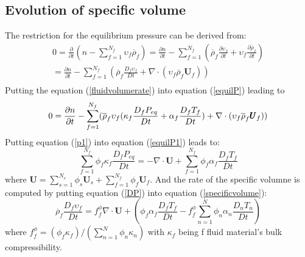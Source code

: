 \documentclass[preprint,12pt]{elsarticle}
\begin{document}
\subsection{\textsf{Evolution of specific volume}}
%
%
The restriction for the equilibrium pressure can be derived from:
%
%
\begin{equation}
\begin{gathered}
    0 = \frac{\partial }{\partial t} (n - \sum_{f=1}^{N_f} \upsilon_f \overline{\rho}_f) =  \frac{\partial n}{\partial t} - \sum_{f=1}^{N_f} (\overline{\rho}_f \frac{\partial \upsilon_f}{\partial t} + \upsilon_f \frac{\partial \overline{\rho}_f}{\partial t}) \\
= \frac{\partial n}{\partial t} - \sum_{f=1}^{N_f} (\overline{\rho}_f \frac{D_f \upsilon_f}{Dt} + \nabla \cdot (\upsilon_f \overline{\rho}_f \pmb{U}_f))\\
\label{equilP}
\end {gathered}
\end {equation}
%
%
Putting the equation (\ref{fluidvolumerate}) into equation (\ref{equilP}) leading to
%
%
\begin{equation} 
\label{equilP1}
    0= \frac{\partial n}{\partial t} - \sum_{f=1}^{N_f} (\overline{\rho}_f \upsilon_f (\kappa_f \frac{D_f P_{eq}}{Dt} + \alpha_f  \frac{D_f T_f}{Dt}) + \nabla \cdot (\upsilon_f \overline{\rho}_f \pmb{U}_f))\\
\end {equation}
%
%
Putting equation (\ref{p1}) into equation (\ref{equilP1}) leads to:
%
%
\begin{equation} 
    \sum_{f=1}^{N_f}  \phi_f \kappa_f \frac{D_f P_{eq}}{Dt} = - \nabla \cdot \pmb{U} + \sum_{f=1}^{N_f} \phi_f \alpha_f \frac{D_f T_f}{Dt}
   \label{DP}
\end {equation}
%
%
where $\pmb{U} = \sum_{s=1}^{N_s} \phi_s \pmb{U}_s + \sum_{f=1}^{N_f}  \phi_f \pmb{U}_f$. And the rate of the specific volumne is computed by putting equation (\ref{DP}) into equation (\ref{specificvolume}):
\begin{equation}
\overline{\rho}_f \frac{D_f \upsilon_f }{Dt} = f_f^{\phi} \nabla \cdot \pmb{U} + (\phi_f \alpha_f \frac{D_f T_f}{Dt} - f_f^{\phi} \sum_{n=1}^{N} \phi_n \alpha_n \frac{D_n T_n}{Dt})
\end {equation}
where $ f_f^{\phi} = (\phi_f  \kappa_f ) / (\sum_{n=1}^{N} \phi_n \kappa_n)$ with  $\kappa_f$ being f fluid material's bulk compressibility.
\end{document}
